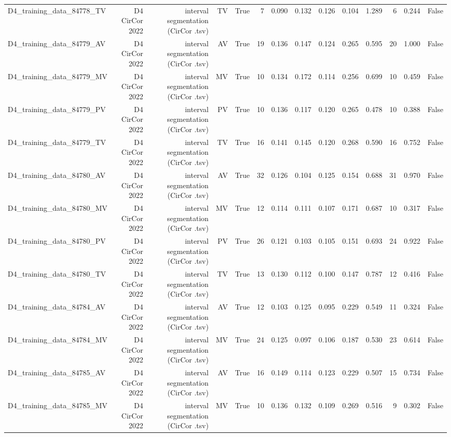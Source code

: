 \begin{table}[htbp]
\begin{tabular}{lrrrrrrrrrrrrr}
    D4\_training\_data\_84778\_TV & D4 CirCor 2022 & interval segmentation (CirCor .tsv) & TV & True & 7 & 0.090 & 0.132 & 0.126 & 0.104 & 1.289 & 6 & 0.244 & False \\
    D4\_training\_data\_84779\_AV & D4 CirCor 2022 & interval segmentation (CirCor .tsv) & AV & True & 19 & 0.136 & 0.147 & 0.124 & 0.265 & 0.595 & 20 & 1.000 & False \\
    D4\_training\_data\_84779\_MV & D4 CirCor 2022 & interval segmentation (CirCor .tsv) & MV & True & 10 & 0.134 & 0.172 & 0.114 & 0.256 & 0.699 & 10 & 0.459 & False \\
    D4\_training\_data\_84779\_PV & D4 CirCor 2022 & interval segmentation (CirCor .tsv) & PV & True & 10 & 0.136 & 0.117 & 0.120 & 0.265 & 0.478 & 10 & 0.388 & False \\
    D4\_training\_data\_84779\_TV & D4 CirCor 2022 & interval segmentation (CirCor .tsv) & TV & True & 16 & 0.141 & 0.145 & 0.120 & 0.268 & 0.590 & 16 & 0.752 & False \\
    D4\_training\_data\_84780\_AV & D4 CirCor 2022 & interval segmentation (CirCor .tsv) & AV & True & 32 & 0.126 & 0.104 & 0.125 & 0.154 & 0.688 & 31 & 0.970 & False \\
    D4\_training\_data\_84780\_MV & D4 CirCor 2022 & interval segmentation (CirCor .tsv) & MV & True & 12 & 0.114 & 0.111 & 0.107 & 0.171 & 0.687 & 10 & 0.317 & False \\
    D4\_training\_data\_84780\_PV & D4 CirCor 2022 & interval segmentation (CirCor .tsv) & PV & True & 26 & 0.121 & 0.103 & 0.105 & 0.151 & 0.693 & 24 & 0.922 & False \\
    D4\_training\_data\_84780\_TV & D4 CirCor 2022 & interval segmentation (CirCor .tsv) & TV & True & 13 & 0.130 & 0.112 & 0.100 & 0.147 & 0.787 & 12 & 0.416 & False \\
    D4\_training\_data\_84784\_AV & D4 CirCor 2022 & interval segmentation (CirCor .tsv) & AV & True & 12 & 0.103 & 0.125 & 0.095 & 0.229 & 0.549 & 11 & 0.324 & False \\
    D4\_training\_data\_84784\_MV & D4 CirCor 2022 & interval segmentation (CirCor .tsv) & MV & True & 24 & 0.125 & 0.097 & 0.106 & 0.187 & 0.530 & 23 & 0.614 & False \\
    D4\_training\_data\_84785\_AV & D4 CirCor 2022 & interval segmentation (CirCor .tsv) & AV & True & 16 & 0.149 & 0.114 & 0.123 & 0.229 & 0.507 & 15 & 0.734 & False \\
    D4\_training\_data\_84785\_MV & D4 CirCor 2022 & interval segmentation (CirCor .tsv) & MV & True & 10 & 0.136 & 0.132 & 0.109 & 0.269 & 0.516 & 9 & 0.302 & False \\

\end{tabular}
\end{table}
